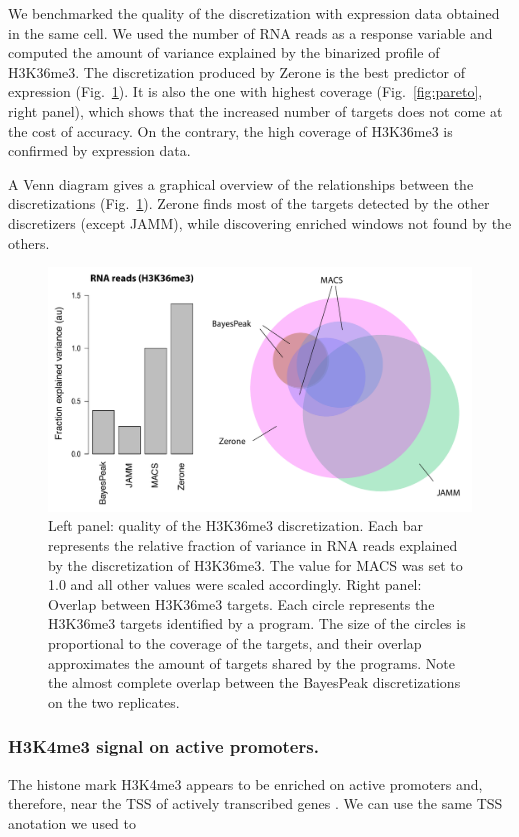 \documentclass{bioinfo}
\begin{document}
We benchmarked the quality of the discretization with expression
data obtained in the same cell. We used the number of RNA reads
as a response variable and computed the amount of variance
explained by the binarized profile of H3K36me3. The discretization
produced by Zerone is the best predictor of expression
(Fig.~\ref{fig:venn}). It is also the one with highest coverage
(Fig.~\ref{fig:pareto}, right panel), which shows that the increased number of
targets does not come at the cost of accuracy. On the contrary,
the high coverage of H3K36me3 is confirmed by expression data.

A Venn diagram gives a graphical overview of the relationships
between the discretizations (Fig.~\ref{fig:venn}). Zerone finds
most of the targets detected by the other discretizers (except JAMM),
while discovering enriched windows not found by the others.

\begin{figure}[!tpb]
\centerline{\includegraphics[scale=0.4]{histone_venn_color_names.pdf}}
\caption{
  Left panel: quality of the H3K36me3 discretization. Each bar
  represents the relative fraction of variance in RNA reads
  explained by the discretization of H3K36me3. The value for MACS was
  set to 1.0 and all other values were scaled accordingly. Right
  panel: Overlap between H3K36me3 targets. Each circle represents the
  H3K36me3 targets identified by a program. The size of the circles
  is proportional to the coverage of the targets, and their overlap
  approximates the amount of targets shared by the programs. Note
  the almost complete overlap between the BayesPeak discretizations
  on the two replicates.
}\label{fig:venn}
\end{figure}

\subsubsection{H3K4me3 signal on active promoters.}
The histone mark H3K4me3 appears to be enriched on active promoters and,
therefore, near the TSS of actively transcribed genes
\citep{pmid15680324,pmid17512414,pmid17277777}.
We can use the same TSS anotation we used to
\end{document}
